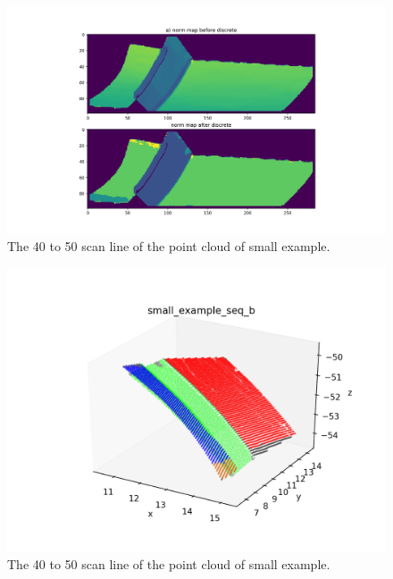 \documentclass[a4paper,12pt]{article}
\begin{document}
  \begin{figure}[H]
  \begin{center}
      \includegraphics[scale=0.5]{norm_map_big.png}
\end{center}
\caption{The 40 to 50 scan line of the point cloud of small example.}
 \label{fig:40_50_sml_origin}
 \end{figure}
 
   \begin{figure}[H]
  \begin{center}
      \includegraphics[scale=0.99]{small_example_seq_b.png}
\end{center}
\caption{The 40 to 50 scan line of the point cloud of small example.}
 \label{fig:40_50_sml_origin}
 \end{figure}

 
\end{document}
